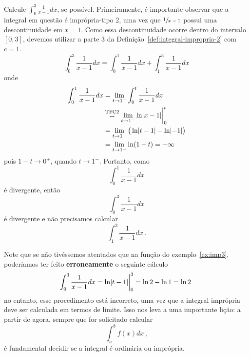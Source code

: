 \begin{example}\label{ex:imp3}
  Calcule \(\int_{0}^3 \frac{1}{x-1} dx\), se possível.
  \solution
  Primeiramente, é importante observar que a integral em questão é
  imprópria-tipo 2, uma vez que $\sfrac{1}{x-1}$ possui uma descontinuidade
  em $x=1$. Como essa descontinuidade ocorre dentro do intervalo $[0, 3]$,
  devemos utilizar a parte 3 da Definição~\ref{def:integral-impropria-2}
  com $c=1$.
  \[
      \int_{0}^3 \frac{1}{x-1} dx
    = \int_{0}^1 \frac{1}{x-1} dx
    + \int_{1}^3 \frac{1}{x-1} dx
  \]
  onde
  \begin{align*}
  \int_{0}^1 \frac{1}{x-1} dx
  & = \lim_{t \to 1^{-}}\int_{0}^t \frac{1}{x-1} dx  \\
  & \stackTFCD \lim_{t \to 1^{-}} \ln\abs{x-1} \evalat{0}{t}  \\
  & = \lim_{t \to 1^{-}}\big(\ln\abs{t-1} - \ln\abs{-1} \big) \\
  & = \lim_{t \to 1^{-}} \ln(1-t) =-\infty
  \end{align*}
  pois $1-t \to 0^+$, quando $t \to 1^{-}$.
  Portanto, como
  \[\int_{0}^1 \frac{1}{x-1} dx\] é divergente, então
  \[\int_{0}^3 \frac{1}{x-1} dx\] é divergente e não precisamos calcular
  \[\int_{1}^3 \frac{1}{x-1} dx \,.\]
\end{example}

Note que se não tivéssemos atentados que na função do exemplo~\ref{ex:imp3},
poderíamos ter feito \textbf{erroneamente} o seguinte cálculo
\[
  \int_{0}^3 \frac{1}{x-1} dx
  = \ln\abs{t-1} \evalat{0}{3}
  = \ln 2 - \ln 1
  = \ln 2 \,\,
\]
no entanto, esse procedimento está incorreto, uma vez que a integral
imprópria deve ser calculada em termos de limite. Isso nos leva a
uma importante lição: a partir de agora, sempre que for solicitado
calcular
\[
  \int_{a}^{b} f(x)dx \,,
\]
é fundamental decidir se a integral
é ordinária ou imprópria.

